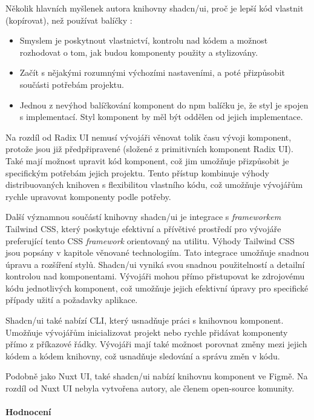 Několik hlavních myšlenek autora knihovny shadcn/ui, proč je lepší kód vlastnit (kopírovat), než používat balíčky \cite{ShadcnUI}:

\begin{itemize}
    \item Smyslem je poskytnout vlastnictví, kontrolu nad kódem a možnost rozhodovat o tom, jak budou komponenty použity a stylizovány.
    \item Začít s nějakými rozumnými výchozími nastaveními, a poté přizpůsobit součásti potřebám projektu.
    \item Jednou z nevýhod balíčkování komponent do npm balíčku je, že styl je spojen s implementací. Styl komponent by měl být oddělen od jejich implementace.
\end{itemize}

Na rozdíl od Radix UI nemusí vývojáři věnovat tolik času vývoji komponent, protože jsou již předpřipravené (složené z primitivních komponent Radix UI). Také mají možnost upravit kód komponent, což jim umožňuje přizpůsobit je specifickým potřebám jejich projektu. Tento přístup kombinuje výhody distribuovaných knihoven s flexibilitou vlastního kódu, což umožňuje vývojářům rychle upravovat komponenty podle potřeby.

Další významnou součástí knihovny shadcn/ui je integrace s \emph{frameworkem} Tailwind CSS, který poskytuje efektivní a přívětivé prostředí pro vývojáře preferující tento CSS \emph{framework} orientovaný na utilitu. Výhody Tailwind CSS jsou popsány v kapitole věnované technologiím. Tato integrace umožňuje snadnou úpravu a rozšíření stylů. Shadcn/ui vyniká svou snadnou použitelností a detailní kontrolou nad komponentami. Vývojáři mohou přímo přistupovat ke zdrojovému kódu jednotlivých komponent, což umožňuje jejich efektivní úpravy pro specifické případy užití a požadavky aplikace.

Shadcn/ui také nabízí CLI, který usnadňuje práci s knihovnou komponent. Umožňuje vývojářům inicializovat projekt nebo rychle přidávat komponenty přímo z příkazové řádky. Vývojáři mají také možnost porovnat změny mezi jejich kódem a kódem knihovny, což usnadňuje sledování a správu změn v kódu.

Podobně jako Nuxt UI, také shadcn/ui nabízí knihovnu komponent ve Figmě. Na rozdíl od Nuxt UI nebyla vytvořena autory, ale členem open-source komunity. \cite{ShadcnUIFigma}

\paragraph{Hodnocení}

